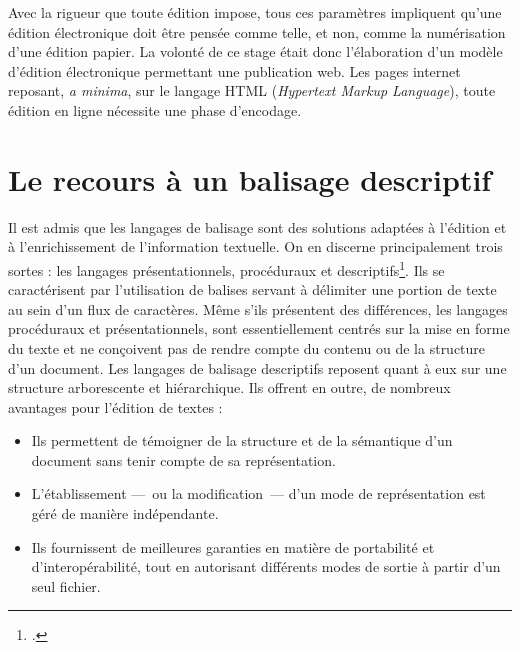 \documentclass[12pt,a4paper]{book} %
\begin{document}
Avec la rigueur que toute édition impose, tous ces paramètres impliquent qu'une édition électronique doit être pensée comme telle, et non, comme la numérisation d'une édition papier.
La volonté de ce stage était donc l'élaboration d'un modèle d'édition électronique permettant une publication web. Les pages internet reposant, \textit{a minima}, sur le langage HTML (\textit{Hypertext Markup Language}), toute édition en ligne nécessite une phase d'encodage.

\section{Le recours à un balisage descriptif}
Il est admis que les langages de balisage sont des solutions adaptées à l'édition et à l'enrichissement de l'information textuelle. On en discerne principalement trois sortes : les langages présentationnels, procéduraux et descriptifs\footcite{coombs_markup_1987}. 
Ils se caractérisent par l'utilisation de balises servant à délimiter une portion de texte au sein d'un flux de caractères. Même s'ils présentent des différences, les langages procéduraux et présentationnels, sont essentiellement centrés sur la mise en forme du texte et ne conçoivent pas de rendre compte du contenu ou de la structure d'un document. Les langages de balisage descriptifs reposent quant à eux sur une structure arborescente et hiérarchique. Ils offrent en outre, de nombreux avantages pour l'édition de textes : 
\begin{itemize}
\item Ils permettent de témoigner de la structure et de la sémantique d'un document sans tenir compte de sa représentation.
\item L'établissement ---~ou la modification~--- d'un mode de représentation est géré de manière indépendante.
\item Ils fournissent de meilleures garanties en matière de portabilité et d'interopérabilité, tout en autorisant différents modes de sortie à partir d'un seul fichier. 
\end{itemize}
\bigskip 
\end{document}
